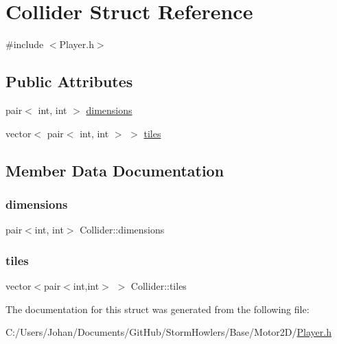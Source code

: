 \hypertarget{struct_collider}{}\section{Collider Struct Reference}
\label{struct_collider}


{\ttfamily \#include $<$Player.\+h$>$}

\subsection*{Public Attributes}
\begin{DoxyCompactItemize}
\item 
pair$<$ int, int $>$ \mbox{\hyperlink{struct_collider_a254708e8fdb741575549f441174244b0}{dimensions}}
\item 
vector$<$ pair$<$ int, int $>$ $>$ \mbox{\hyperlink{struct_collider_a5eac05cbd4f236cf0bf5d40806f7f4c0}{tiles}}
\end{DoxyCompactItemize}


\subsection{Member Data Documentation}
\mbox{\label{struct_collider_a254708e8fdb741575549f441174244b0}} 
\subsubsection{\texorpdfstring{dimensions}{dimensions}}
{\footnotesize\ttfamily pair$<$int, int$>$ Collider\+::dimensions}

\mbox{\label{struct_collider_a5eac05cbd4f236cf0bf5d40806f7f4c0}} 
\subsubsection{\texorpdfstring{tiles}{tiles}}
{\footnotesize\ttfamily vector$<$pair$<$int,int$>$ $>$ Collider\+::tiles}



The documentation for this struct was generated from the following file\+:\begin{DoxyCompactItemize}
\item 
C\+:/\+Users/\+Johan/\+Documents/\+Git\+Hub/\+Storm\+Howlers/\+Base/\+Motor2\+D/\mbox{\hyperlink{_player_8h}{Player.\+h}}\end{DoxyCompactItemize}
